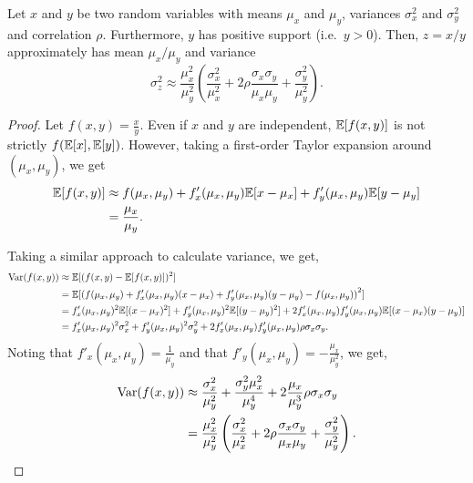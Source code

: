 \begin{lemma}
\label{lem:variance-ratio}
  Let $x$ and $y$ be two random variables with means $\mu_x$ and $\mu_y$, variances $\sigma^2_x$ and $\sigma^2_y$ and correlation $\rho$. Furthermore, $y$ has positive support (i.e.\ $y > 0$). 
  Then, $z = x / y$ approximately has mean $\mu_x / \mu_y$ and variance
  $$\sigma^2_z \approx \frac{\mu^2_x}{\mu_y^2} \left(\frac{\sigma_x^2}{\mu_x^2} 
    + 2\rho \frac{\sigma_x \sigma_y}{\mu_x \mu_y}
    + \frac{\sigma_y^2}{\mu_y^2} \right).$$

\end{lemma}
\begin{proof}
  Let $f(x,y) = \frac{x}{y}$.
  Even if $x$ and $y$ are independent, $\mathbb{E}[f(x,y)]$ is not strictly $f(\mathbb{E}[x],\mathbb{E}[y])$.
  However, taking a first-order Taylor expansion around $(\mu_x, \mu_y)$, we get
  \begin{align*}
    \mathbb{E}[f(x,y)] 
     &\approx f(\mu_x,\mu_y) + f_x'(\mu_x, \mu_y) \mathbb{E}[x - \mu_x] + f'_y(\mu_x, \mu_y) \mathbb{E}[y - \mu_y] \\
     &= \frac{\mu_x}{\mu_y}.
  \end{align*}

  Taking a similar approach to calculate variance, we get,
  \begin{align*}
    \text{Var}(f(x,y)) 
             &\approx \mathbb{E}[(f(x,y) - \mathbb{E}[f(x,y)])^2] \\
             &= \mathbb{E}[{(f(\mu_x,\mu_y) + f'_x(\mu_x, \mu_y) (x - \mu_x) + f'_y(\mu_x, \mu_y) (y - \mu_y) - f(\mu_x, \mu_y))}^2] \\
             &= f'_x(\mu_x, \mu_y)^2 \mathbb{E}[(x - \mu_x)^2] + f'_y(\mu_x, \mu_y)^2 \mathbb{E}[(y - \mu_y)^2] 
              + 2 f'_x(\mu_x, \mu_y)f'_y(\mu_x, \mu_y) \mathbb{E}[(x - \mu_x)(y - \mu_y)]\\
             &= f'_x(\mu_x, \mu_y)^2 \sigma_x^2 + f'_y(\mu_x, \mu_y)^2 \sigma_y^2
              + 2 f'_x(\mu_x, \mu_y)f'_y(\mu_x, \mu_y) \rho \sigma_x \sigma_y.
  \end{align*}
  Noting that $f'_x(\mu_x, \mu_y) = \frac{1}{\mu_y}$ and that $f'_y(\mu_x, \mu_y) = -\frac{\mu_x}{\mu_y^2}$, we get,
  \begin{align*}
    \text{Var}(f(x,y)) 
    &\approx \frac{\sigma_x^2}{\mu_y^2} + \frac{\sigma_y^2 \mu_x^2}{\mu_y^4}
    + 2 \frac{\mu_x}{\mu_y^3} \rho \sigma_x \sigma_y \\
    &= \frac{\mu^2_x}{\mu_y^2} \left(\frac{\sigma_x^2}{\mu_x^2} 
    + 2\rho \frac{\sigma_x \sigma_y}{\mu_x \mu_y}
    + \frac{\sigma_y^2}{\mu_y^2} \right).
 \end{align*}
\end{proof}

